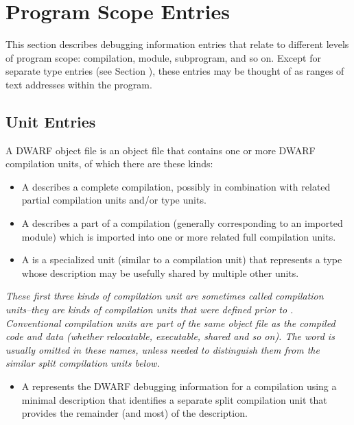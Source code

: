\chapter{Program Scope Entries}
\label{chap:programscopeentries}
This section describes debugging information entries that
relate to different levels of program scope: compilation,
module, subprogram, and so on. Except for separate type
entries (see Section ),
these entries may be thought of as
ranges of text addresses within the program.

\section{Unit Entries}
\label{chap:unitentries}
A DWARF object file is an object file that contains one or more
DWARF compilation units, of which there are these kinds:
\begin{itemize}
\item A  describes
a complete compilation, possibly in combination with
related partial compilation units and/or type units.

\item A  describes
a part of a compilation (generally corresponding to an
imported module) which is imported into one or more
related full compilation units.

\item A  is a specialized unit
(similar to a compilation unit) that represents a type
whose description may be usefully shared by multiple
other units.
\end{itemize}


\textit{These first three kinds of compilation unit are
sometimes called  compilation
units--they are kinds of compilation units that were
defined prior to \DWARFVersionV. Conventional compilation units
are part of the same object file as the compiled code and
data (whether relocatable, executable, shared and so on).
The word  is usually
omitted in these names, unless needed to distinguish them
from the similar split compilation units below.}

\begin{itemize}
\item A  represents
the DWARF debugging information for a compilation using a
minimal description that identifies a separate split
compilation unit that provides the remainder (and most)
of the description.
\end{itemize}

